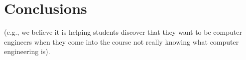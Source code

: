 \section{Conclusions}
\label{sec:conclude}


(e.g., we believe it is helping students discover
that they want to be computer engineers when they come into the course
not really knowing what computer engineering is).
